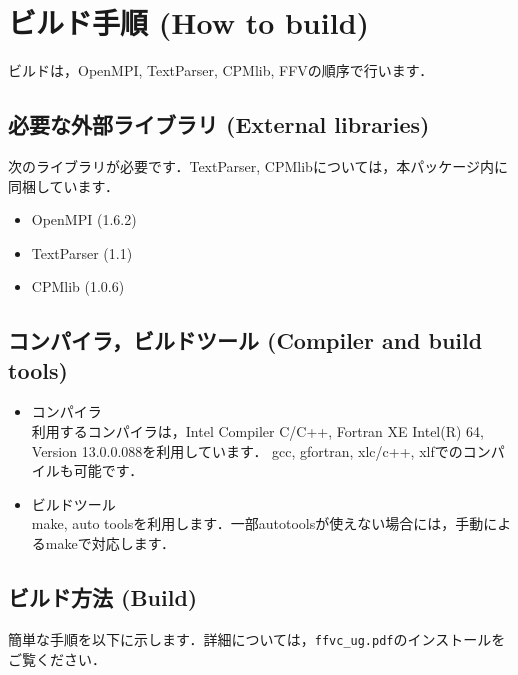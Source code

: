 \documentclass[a4paper,10pt,oneside,fleqn]{jsarticle}
\begin{document}
\clearpage

\section{ビルド手順 (How to build)}
ビルドは，OpenMPI, TextParser, CPMlib, FFVの順序で行います．

%
\subsection{必要な外部ライブラリ (External libraries)}

次のライブラリが必要です．TextParser, CPMlibについては，本パッケージ内に同梱しています．

\begin{itemize}
\item OpenMPI (1.6.2)
\item TextParser (1.1)
\item CPMlib (1.0.6)
\end{itemize}


%
\subsection{コンパイラ，ビルドツール (Compiler and build tools)}

\begin{itemize}
\item コンパイラ\\
利用するコンパイラは，Intel Compiler C/C++, Fortran XE Intel(R) 64, Version 13.0.0.088を利用しています．
gcc, gfortran, xlc/c++, xlfでのコンパイルも可能です．

\item ビルドツール\\
make, auto toolsを利用します．一部autotoolsが使えない場合には，手動によるmakeで対応します．

\end{itemize}
   
   
%
\subsection{ビルド方法 (Build)}
簡単な手順を以下に示します．詳細については，\verb|ffvc_ug.pdf|のインストールをご覧ください．
\end{document}
